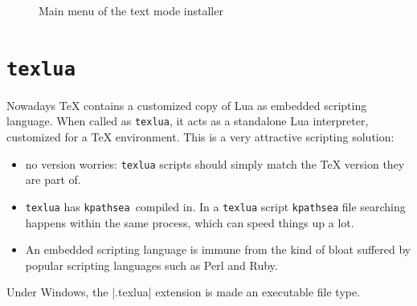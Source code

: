 \documentclass{ltugproc}
\newcommand{\pl}{Perl}
\newcommand{\tlu}{\texttt{texlua}}
\newcommand{\kpse}{\texttt{kpathsea}}
\begin{document}
\begin{figure}[htb]
  \centering
  \caption{Main menu of the text mode installer}
  \label{fig:text_main_menu}
\end{figure}

\section{\tlu}
\label{sec:texlua}

Nowadays \TeX{} contains a customized copy of Lua as embedded
scripting language. When called as \tlu, it acts as a standalone Lua
interpreter, customized for a \TeX{} environment. This is a very
attractive scripting solution:
\begin{itemize}
\item no version worries: \tlu{} scripts should simply match the
  \TeX{} version they are part of.
\item \tlu{} has \kpse\ compiled in.  In a \tlu{} script \kpse{}
  file searching happens within the same process, which can speed
  things up a lot.
\item An embedded scripting language is immune from the kind of
  bloat suffered by popular scripting languages such as \pl{} and
  Ruby.
\end{itemize}
Under Windows, the |.texlua| extension is made an executable file
type.
\end{document}
